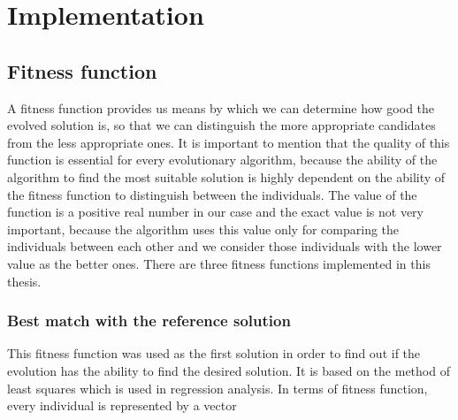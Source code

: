 \chapter{Implementation}

\section{Fitness function}
A fitness function provides us means by which we can determine how good the evolved solution is, so that we can distinguish the more appropriate candidates from the less appropriate ones. It is important to mention that the quality of this function is essential for every evolutionary algorithm, because the ability of the algorithm to find the most suitable solution is highly dependent on the ability of the fitness function to distinguish between the individuals. The value of the function is a positive real number in our case and the exact value is not very important, because the algorithm uses this value only for comparing the individuals between each other and we consider those individuals with the lower value as the better ones. There are three fitness functions implemented in this thesis.

\subsection{Best match with the reference solution}
This fitness function was used as the first solution in order to find out if the evolution has the ability to find the desired solution. It is based on the method of least squares which is used in regression analysis.
In terms of fitness function, every individual is represented by a vector
